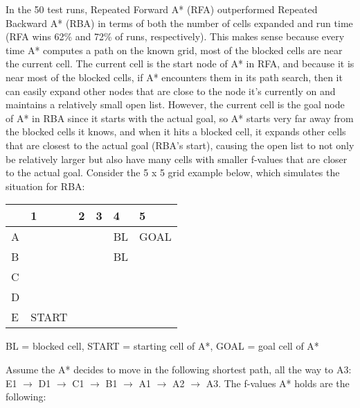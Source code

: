 \documentclass[10pt,a4paper]{article}
\begin{document}
In the 50 test runs, Repeated Forward A* (RFA) outperformed Repeated Backward A* (RBA) in terms of both the number of cells expanded and run time (RFA wins 62\% and 72\% of runs, respectively). This makes sense because every time A* computes a path on the known grid, most of the blocked cells are near the current cell. The current cell is the start node of A* in RFA, and because it is near most of the blocked cells, if A* encounters them in its path search, then it can easily expand other nodes that are close to the node it's currently on and maintains a relatively small open list. However, the current cell is the goal node of A* in RBA since it starts with the actual goal, so A* starts very far away from the blocked cells it knows, and when it hits a blocked cell, it expands other cells that are closest to the actual goal (RBA's start), causing the open list to not only be relatively larger but also have many cells with smaller f-values that are closer to the actual goal. Consider the 5 x 5 grid example below, which simulates the situation for RBA:
\newline\newline
\begin{center}
\begin{tabular}{ p{1.5cm}|p{1.5cm}|p{1.5cm}|p{1.5cm}|p{1.5cm}|p{1.5cm}| }
& 1 & 2 & 3 & 4 & 5\\[4ex]
 \hline
 A &  &  &  & BL & GOAL \\[4ex]
 \hline
 B &  &  &  & BL & \\[4ex]
 \hline
 C &  &  &  &  & \\[4ex]
 \hline
 D &  &  &  &  & \\[4ex]
 \hline
 E & START &  &  &  & \\[4ex]
 \hline
\end{tabular}
\newline
BL = blocked cell, START = starting cell of A*, GOAL = goal cell of A*
\end{center}
Assume the A* decides to move in the following shortest path, all the way to A3: E1 $\rightarrow$ D1 $\rightarrow$ C1 $\rightarrow$ B1 $\rightarrow$ A1 $\rightarrow$ A2 $\rightarrow$ A3. The f-values A* holds are the following:
\newline\newline
\end{document}
